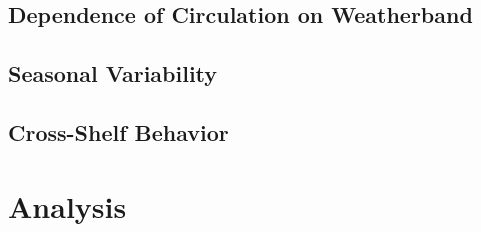 \documentclass[11pt]{article}
\begin{document}
\subsection{Dependence of Circulation on Weatherband}

\subsection{Seasonal Variability}

\subsection{Cross-Shelf Behavior}

\section{Analysis}



\end{document}
